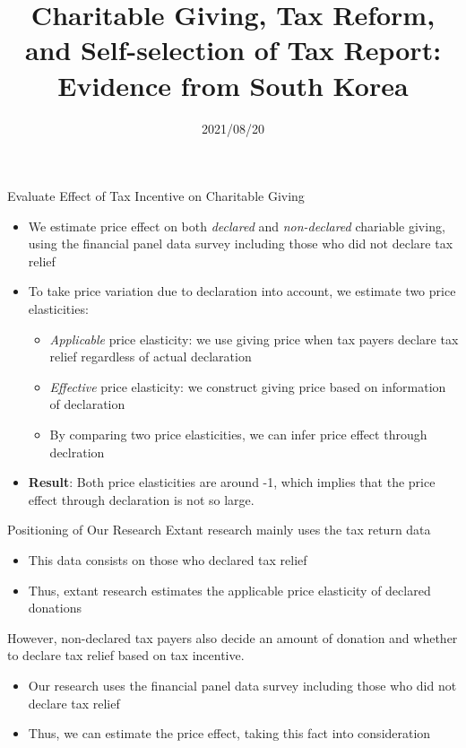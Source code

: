 \documentclass[
  ignorenonframetext,
  aspectratio=169,
]{beamer}
\title{Charitable Giving, Tax Reform, and Self-selection of Tax Report: Evidence from South Korea}
\author[shortname]{ Hiroki Kato \inst{1} \and  Tsuyoshi Goto \inst{2} \and  Yong-Rok Kim \inst{3} \and }
\institute[shortinst]{ \inst{1} Osaka University \and  \inst{2} Chiba University \and  \inst{3} Kobe University \and }
\date{2021/08/20}
\providecommand{\tightlist}{%
  \setlength{\itemsep}{0pt}\setlength{\parskip}{0pt}}
\begin{document}
\frame{\titlepage}

\begin{frame}{Evaluate Effect of Tax Incentive on Charitable Giving}
\protect\hypertarget{evaluate-effect-of-tax-incentive-on-charitable-giving}{}
\begin{itemize}
\tightlist
\item
  We estimate price effect on both \emph{declared} and \emph{non-declared} chariable giving, using the financial panel data survey including those who did not declare tax relief
\item
  To take price variation due to declaration into account, we estimate two price elasticities:

  \begin{itemize}
  \tightlist
  \item
    \emph{Applicable} price elasticity: we use giving price when tax payers declare tax relief regardless of actual declaration
  \item
    \emph{Effective} price elasticity: we construct giving price based on information of declaration
  \item
    By comparing two price elasticities, we can infer price effect through declration
  \end{itemize}
\item
  \textbf{Result}: Both price elasticities are around -1, which implies that the price effect through declaration is not so large.
\end{itemize}
\end{frame}

\begin{frame}{Positioning of Our Research}
\protect\hypertarget{positioning-of-our-research}{}
Extant research mainly uses the tax return data

\begin{itemize}
\tightlist
\item
  This data consists on those who declared tax relief
\item
  Thus, extant research estimates the applicable price elasticity of declared donations
\end{itemize}

However, non-declared tax payers also decide an amount of donation and whether to declare tax relief based on tax incentive.

\begin{itemize}
\tightlist
\item
  Our research uses the financial panel data survey including those who did not declare tax relief
\item
  Thus, we can estimate the price effect, taking this fact into consideration
\end{itemize}
\end{frame}
\end{document}
